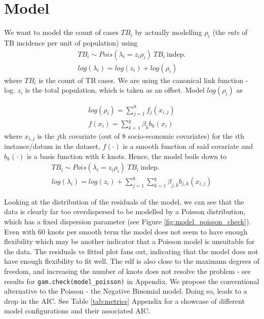 \section{Model}
We want to model the count of cases $TB_i$ by actually modelling $\rho_i$ (the \textit{rate} of TB incidence per unit of population) using
$$
\begin{aligned}
	TB_i \sim Pois(\lambda_i = z_i \rho_i) \ TB_i\  \mathrm{indep.} 
	\\
	log(\lambda_i) = log(z_i) + log(\rho_i)
\end{aligned}
$$
where $TB_i$ is the count of TB cases. We are using the canonical link function - log. $z_i$ is the total population, which is taken as an offset. Model $log(\rho_i)$ as

$$
\begin{aligned}
	log(\rho_i) = \sum_{j=1}^{8}f_{j}(x_{i,j})
	\\
	f(x_i) = \sum_{k=1}^{q}\beta_{k}b_{k}(x_i)
\end{aligned}
$$
where $x_{i,j}$ is the $j$th covariate (out of 8 socio-economic covariates) for the $i$th instance/datum in the dataset, $f(\cdot)$ is a smooth function of said covariate and $b_k(\cdot)$ is a basis function with $k$ knots. Hence, the model boils down to
$$
\begin{aligned}
	TB_i \sim Pois(\lambda_i = z_i \rho_i) \ TB_i\  \mathrm{indep.} 
	\\
	log(\lambda_i) = log(z_i) +  \sum_{j=1}^{8}\sum_{k=1}^{q}\beta_{j,k}b_{j,k}(x_{i,j})
\end{aligned}
$$

Looking at the distribution of the residuals of the model, we can see that the data is clearly far too overdispersed to be modelled by a Poisson distribution, which has a fixed dispersion parameter (see Figure \ref{fig:model_poisson_check}). Even with 60 knots per smooth term the model does not seem to have enough flexibility which may be another indicator that a Poisson model is unsuitable for the data. The residuals vs fitted plot fans out, indicating that the model does not have enough flexibility to fit well. The edf is also close to the maximum degrees of freedom, and increasing the number of knots does not resolve the problem - see results for \texttt{gam.check(model\_poisson)} in Appendix. We propose the conventional alternative to the Poisson - the Negative Binomial model. Doing so, leads to a drop in the AIC. See Table \ref{tab:metrics} Appendix for a showcase of different model configurations and their associated AIC.

